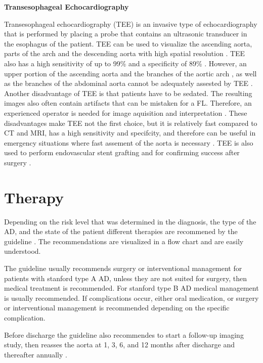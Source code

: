 \documentclass[thesis.tex]{subfiles}
\begin{document}
\textbf{Transesophageal Echocardiography}

Transesophageal echocardiography (TEE) is an invasive type of echocardiography that is performed by placing a probe that contains an ultrasonic transducer in the esophagus of the patient. TEE can be used to visualize the ascending aorta, parts of the arch and the descending aorta with high spatial resolution \cite{baliga2014role}. TEE also has a high sensitivity of up to 99\% and a specificity of 89\% \cite{baliga2014role}. However, an upper portion of the ascending aorta and the branches of the aortic arch \cite{shiga2006diagnostic,baliga2014role}, as well as the branches of the abdominal aorta cannot be adequately assested by TEE \cite{baliga2014role}. Another disadvantage of TEE is that patients have to be sedated. The resulting images also often contain artifacts that can be mistaken for a FL. Therefore, an experienced operator is needed for image aquisition and interpretation \cite{shiga2006diagnostic,baliga2014role}. These disadvantages make TEE not the first choice, but it is relatively fast compared to CT and MRI, has a high sensitivity and specifcity, and therefore can be useful in emergency situations where fast assement of the aorta is necessary \cite{shiga2006diagnostic,baliga2014role}. TEE is also used to perform endovascular stent grafting and for confirming success after surgery \cite{baliga2014role}. 


\section{Therapy} 

Depending on the risk level that was determined in the diagnosis, the type of the AD, and the state of the patient different therapies are recommened by the guideline \cite{hiratzka20102010}. The recommendations are visualized in a flow chart and are easily understood.

The guideline usually recommends surgery or interventional management for patients with stanford type A AD, unless they are not suited for surgery, then medical treatment is recommended. For stanford type B AD medical management is usually recommended. If complications occur, either oral medication, or surgery or interventional management is recommended depending on the specific complication. 

Before discharge the guideline also recommendes to start a follow-up imaging study, then reasses the aorta at 1, 3, 6, and 12 months after discharge and thereafter annually \cite{hiratzka20102010}.
\end{document}
